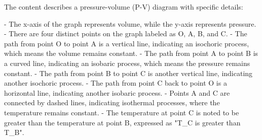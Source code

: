 The content describes a pressure-volume (P-V) diagram with specific details:

- The x-axis of the graph represents volume, while the y-axis represents pressure.
- There are four distinct points on the graph labeled as O, A, B, and C.
- The path from point O to point A is a vertical line, indicating an isochoric process, which means the volume remains constant.
- The path from point A to point B is a curved line, indicating an isobaric process, which means the pressure remains constant.
- The path from point B to point C is another vertical line, indicating another isochoric process.
- The path from point C back to point O is a horizontal line, indicating another isobaric process.
- Points A and C are connected by dashed lines, indicating isothermal processes, where the temperature remains constant.
- The temperature at point C is noted to be greater than the temperature at point B, expressed as "T_C is greater than T_B".